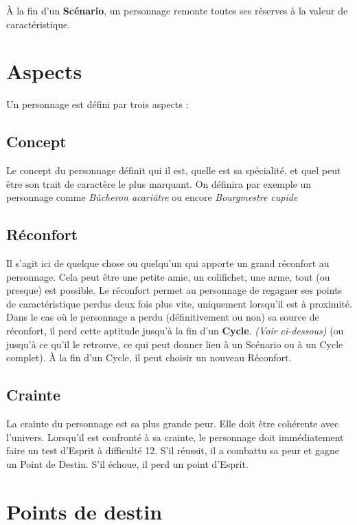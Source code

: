 \documentclass[10pt,twoside,twocolumn,openany,bg=print,justified]{dndbook}
\begin{document}
À la fin d'un \textbf{Scénario}, un personnage remonte toutes ses réserves à la valeur de caractéristique.
\newpage
\section{Aspects}

Un personnage est défini par trois aspects :

\subsection*{Concept}

Le concept du personnage définit qui il est, quelle est sa spécialité, et quel peut être son trait de caractère le plus marquant. On définira par exemple un personnage comme \emph{Bûcheron acariâtre} ou encore \emph{Bourgmestre cupide}

\subsection*{Réconfort}

Il s'agit ici de quelque chose ou quelqu'un qui apporte un grand réconfort au personnage. Cela peut être une petite amie, un colifichet, une arme, tout (ou presque) est possible. Le réconfort permet au personnage de regagner ses points de caractéristique perdus deux fois plus vite, uniquement lorsqu'il est à proximité. Dans le cas où le personnage a perdu (définitivement ou non) sa source de réconfort, il perd cette aptitude jusqu'à la fin d'un \textbf{Cycle}. \emph{(Voir ci-dessous)} (ou jusqu'à ce qu'il le retrouve, ce qui peut donner lieu à un Scénario ou à un Cycle complet). À la fin d'un Cycle, il peut choisir un nouveau Réconfort.

\subsection*{Crainte}

La crainte du personnage est sa plus grande peur. Elle doit être cohérente avec l'univers. Lorsqu'il est confronté à sa crainte, le personnage doit immédiatement faire un test d'Esprit à difficulté 12. S'il réussit, il a combattu sa peur et gagne un Point de Destin. S'il échoue, il perd un point d'Esprit.

\section{Points de destin}
\end{document}
